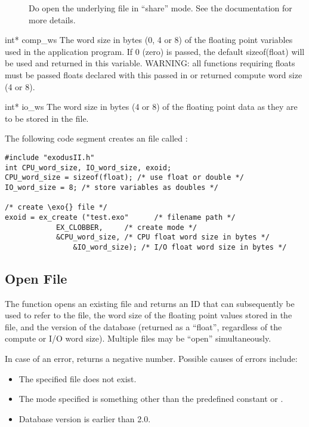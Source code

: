 \begin{parameters}
\begin{description}
\item[]
Do open the underlying  file in ``share'' mode. See the 
documentation for more details.
\end{description}

\item[{int* comp_ws \RW{}}]
{The word size in bytes (0, 4 or 8) of the floating point variables
used in the application program. If 0 (zero) is passed, the default
sizeof(float) will be used and returned in this variable. WARNING: all
\exo{} functions requiring floats must be passed floats declared with
this passed in or returned compute word size (4 or 8).}

\item[{int* io_ws \R{}}] {The word size in bytes (4 or 8) of the
floating point data as they are to be stored in the \exo{} file.}
\end{parameters}

The following code segment creates an \exo{} file called :

\begin{lstlisting}
#include "exodusII.h"
int CPU_word_size, IO_word_size, exoid;
CPU_word_size = sizeof(float); /* use float or double */
IO_word_size = 8; /* store variables as doubles */

/* create \exo{} file */
exoid = ex_create ("test.exo"      /* filename path */
		    EX_CLOBBER,     /* create mode */
		    &CPU_word_size, /* CPU float word size in bytes */
	            &IO_word_size); /* I/O float word size in bytes */
\end{lstlisting}


\subsection{Open \exo{} File}

The function  opens an existing \exo{} file and
returns an ID that can subsequently be used to refer to the file, the
word size of the floating point values stored in the file, and the
version of the \exo{} database (returned as a ``float'', regardless of
the compute or I/O word size). Multiple files may be ``open''
simultaneously.


In case of an error,  returns a negative
number. Possible causes of errors include:

\begin{itemize}
\item The specified file does not exist.

 \item The mode specified is something other than the predefined
constant  or .


 \item Database version is earlier than 2.0.
\end{itemize}


